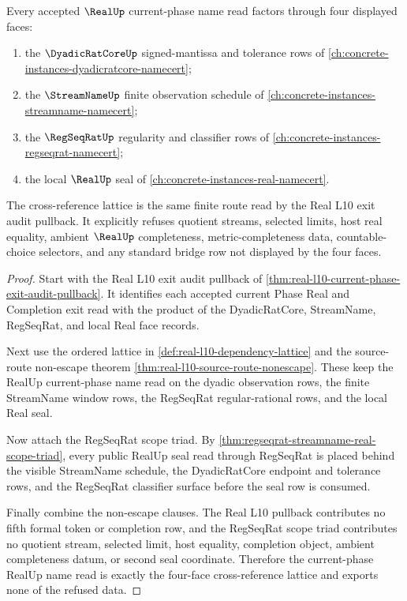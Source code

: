 \begin{theorem}
\label{thm:real-dyadic-regseq-crossref-lattice}
Every accepted $\RealUp$ current-phase name read factors through four displayed faces:
\begin{enumerate}
\item the $\DyadicRatCoreUp$ signed-mantissa and tolerance rows of \autoref{ch:concrete-instances-dyadicratcore-namecert};
\item the $\StreamNameUp$ finite observation schedule of \autoref{ch:concrete-instances-streamname-namecert};
\item the $\RegSeqRatUp$ regularity and classifier rows of \autoref{ch:concrete-instances-regseqrat-namecert};
\item the local $\RealUp$ seal of \autoref{ch:concrete-instances-real-namecert}.
\end{enumerate}
The cross-reference lattice is the same finite route read by the Real L10 exit audit pullback. It explicitly refuses quotient streams, selected limits, host real equality, ambient $\RealUp$ completeness, metric-completeness data, countable-choice selectors, and any standard bridge row not displayed by the four faces.
\end{theorem}
\begin{proof}
Start with the Real L10 exit audit pullback of \autoref{thm:real-l10-current-phase-exit-audit-pullback}. It identifies each accepted current Phase Real and Completion exit read with the product of the DyadicRatCore, StreamName, RegSeqRat, and local Real face records.

Next use the ordered lattice in \autoref{def:real-l10-dependency-lattice} and the source-route non-escape theorem \autoref{thm:real-l10-source-route-nonescape}. These keep the RealUp current-phase name read on the dyadic observation rows, the finite StreamName window rows, the RegSeqRat regular-rational rows, and the local Real seal.

Now attach the RegSeqRat scope triad. By \autoref{thm:regseqrat-streamname-real-scope-triad}, every public RealUp seal read through RegSeqRat is placed behind the visible StreamName schedule, the DyadicRatCore endpoint and tolerance rows, and the RegSeqRat classifier surface before the seal row is consumed.

Finally combine the non-escape clauses. The Real L10 pullback contributes no fifth formal token or completion row, and the RegSeqRat scope triad contributes no quotient stream, selected limit, host equality, completion object, ambient completeness datum, or second seal coordinate. Therefore the current-phase RealUp name read is exactly the four-face cross-reference lattice and exports none of the refused data.
\end{proof}

